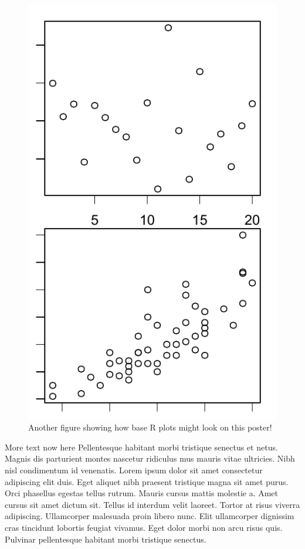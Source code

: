\documentclass[article,30pt,extrafontsizes]{memoir}
\begin{document}
\begin{multicols*}{3}
{\begin{figure}
{\centering \includegraphics[width=0.65\linewidth]{skeleton_files/figure-latex/unnamed-chunk-5-1} 

}

\caption{Another figure showing how base R plots might look on this poster!}\label{fig:unnamed-chunk-5}
\end{figure}

More text now here Pellentesque habitant morbi tristique senectus et
netus. Magnis dis parturient montes nascetur ridiculus mus mauris vitae
ultricies. Nibh nisl condimentum id venenatis. Lorem ipsum dolor sit
amet consectetur adipiscing elit duis. Eget aliquet nibh praesent
tristique magna sit amet purus. Orci phasellus egestas tellus rutrum.
Mauris cursus mattis molestie a. Amet cursus sit amet dictum sit. Tellus
id interdum velit laoreet. Tortor at risus viverra adipiscing.
Ullamcorper malesuada proin libero nunc. Elit ullamcorper dignissim cras
tincidunt lobortis feugiat vivamus. Eget dolor morbi non arcu risus
quis. Pulvinar pellentesque habitant morbi tristique senectus.
\printbibliography
}
\end{multicols*}

\end{document}
